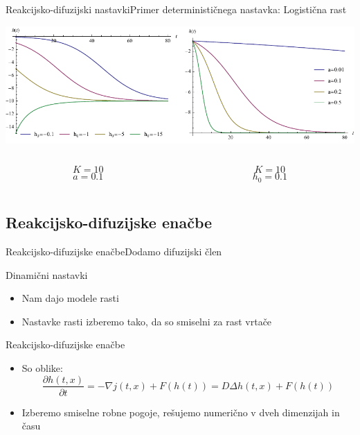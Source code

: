 \documentclass{beamer}
\begin{document}
\begin{frame}{Reakcijsko-difuzijski nastavki}{Primer determinističnega nastavka: Logistična rast}
\begin{center}
  \hspace*{-0.09\textwidth}\includegraphics[width=1.2\textwidth]{slike/logisticna-rast}
  \footnotesize
\begin{columns}
  \begin{column}{0.5\textwidth}
  \[ K = 10 \]
  \[ a = 0.1 \]
  \end{column}
  \begin{column}{0.5\textwidth}
  \[ K = 10 \]
  \[ h_0 = 0.1 \]
  \end{column}
\end{columns}
\end{center}
\end{frame}


\subsection{Reakcijsko-difuzijske enačbe}

\begin{frame}{Reakcijsko-difuzijske enačbe}{Dodamo difuzijski člen}

\begin{block}{Dinamični nastavki}
  \begin{itemize}
  \item
    Nam dajo modele rasti
  \item
    Nastavke rasti izberemo tako, da so smiselni za rast vrtače
  \end{itemize}
\end{block}
\begin{block}{Reakcijsko-difuzijske enačbe}
  \begin{itemize}
  \item
    So oblike: \begin{equation}  \frac{ \partial h(t,x) }{ \partial t} = - \nabla j(t,x) + F( h(t) )= D \Delta h(t,x) + F( h(t) ) \end{equation}
  \item
    Izberemo smiselne robne pogoje, rešujemo numerično v dveh dimenzijah in času
  \end{itemize}
\end{block}
\end{frame}
\end{document}
